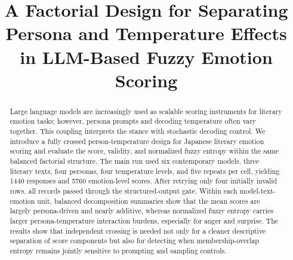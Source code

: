 \documentclass[conference]{IEEEtran}
\begin{document}
\title{A Factorial Design for Separating Persona and Temperature Effects in LLM-Based Fuzzy Emotion Scoring}

\author{
\and
{}
\and
{}
\and
{}
\and
{}
}

\maketitle

\begin{abstract}
Large language models are increasingly used as scalable scoring instruments for literary emotion tasks; however, persona prompts and decoding temperature often vary together.
This coupling interprets the stance with stochastic decoding control.
We introduce a fully crossed person-temperature design for Japanese literary emotion scoring and evaluate the score, validity, and normalized fuzzy entropy within the same balanced factorial structure.
The main run used six contemporary models, three literary texts, four personas, four temperature levels, and five repeats per cell, yielding 1440 responses and 5760 emotion-level scores.
After retrying only four initially invalid rows, all records passed through the structured-output gate.
Within each model-text-emotion unit, balanced decomposition summaries show that the mean scores are largely persona-driven and nearly additive, whereas normalized fuzzy entropy carries larger persona-temperature interaction burdens, especially for anger and surprise.
The results show that independent crossing is needed not only for a cleaner descriptive separation of score components but also for detecting when membership-overlap entropy remains jointly sensitive to prompting and sampling controls.
\end{abstract}
\end{document}
